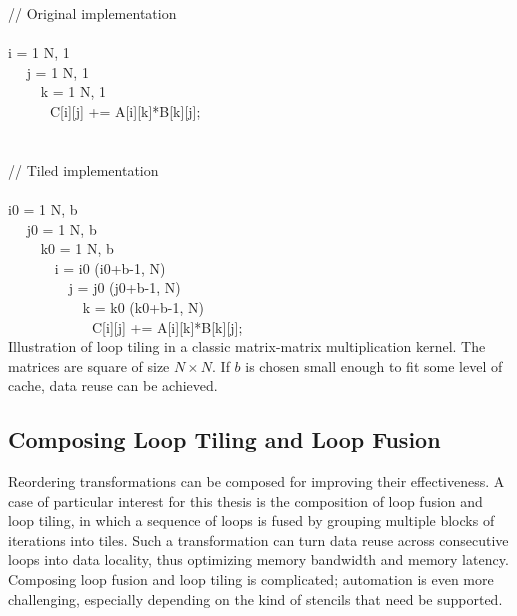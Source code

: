 \begin{algorithm}[t]
\scriptsize\ttfamily
{}

// Original implementation\\
~\\
 i = 1  N, 1\\
~~ j = 1  N, 1\\
~~~~ k = 1  N, 1\\
~~~~~~C[i][j] += A[i][k]*B[k][j];\\

~\\
~\\
// Tiled implementation\\
~\\
 i0 = 1  N, b\\
~~ j0 = 1  N, b\\
~~~~ k0 = 1  N, b\\
~~~~~~ i = i0  (i0+b-1, N)\\
~~~~~~~~ j = j0  (j0+b-1, N)\\
~~~~~~~~~~ k = k0  (k0+b-1, N)\\
~~~~~~~~~~~~C[i][j] += A[i][k]*B[k][j];\\


\caption{Illustration of loop tiling in a classic matrix-matrix multiplication kernel\protect\footnotemark. The matrices are square of size $N \times N$. If $b$ is chosen small enough to fit some level of cache, data reuse can be achieved.}
\label{code:loop-tiling}
\end{algorithm}


\subsection{Composing Loop Tiling and Loop Fusion}
\label{sec:bkg:tiling}
Reordering transformations can be composed for improving their effectiveness. A case of particular interest for this thesis is the composition of loop fusion and loop tiling, in which a sequence of loops is fused by grouping multiple blocks of iterations into tiles. Such a transformation can turn data reuse across consecutive loops into data locality, thus optimizing memory bandwidth and memory latency. Composing loop fusion and loop tiling is complicated; automation is even more challenging, especially depending on the kind of stencils that need be supported.

